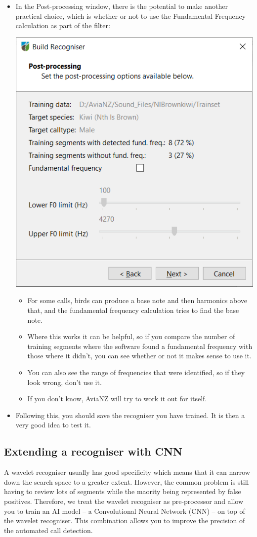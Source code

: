 \documentclass{article}
\begin{document}
\begin{itemize}
\item In the Post-processing window, there is the potential to make another practical choice, which is whether or not to use the Fundamental Frequency calculation as part of the filter:

\begin{center}
    \includegraphics[width=.4\textwidth]{Figs/Wizard_post}
\end{center}

\begin{itemize}
\item For some calls, birds can produce a base note and then harmonics above that, and the fundamental frequency calculation tries to find the base note. 
\item Where this works it can be helpful, so if you compare the number of training segments where the software found a fundamental frequency with those where it didn't, you can see whether or not it makes sense to use it. 
\item You can also see the range of frequencies that were identified, so if they look wrong, don't use it. 
\item If you don't know, AviaNZ will try to work it out for itself. 
\end{itemize}

\item Following this, you should save the recogniser you have trained. It is then a very good idea to test it. 
    
\end{itemize}

\subsection{Extending a recogniser with CNN}\label{sec:cnnfilter}
A wavelet recogniser usually has good specificity which means that it can narrow down the search space to a greater extent. However, the common problem is still having to review lots of segments while the maority being represented by false positives. Therefore, we treat the wavelet recogniser as pre-processor and allow you to train an AI model -- a Convolutional Neural Network (CNN) -- on top of the wavelet recogniser. This combination allows you to improve the precision of the automated call detection. 
\end{document}
